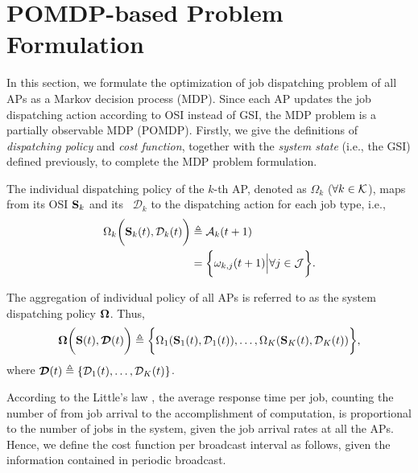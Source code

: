 \section{POMDP-based Problem Formulation}
\label{sec:formulation}
In this section, we formulate the optimization of job dispatching problem of all APs as a Markov decision process (MDP).
Since each AP updates the job dispatching action according to OSI instead of GSI, the MDP problem is a partially observable MDP (POMDP).
Firstly, we give the definitions of \emph{dispatching policy} and \emph{cost function}, together with the \emph{system state} (i.e., the GSI) defined previously, to complete the MDP problem formulation.

\begin{definition}
    The individual dispatching policy of the $k$-th AP, denoted as $\Omega_{k}$ ($\forall k \in\mathcal{K}$), maps from its OSI $\mathbf{S}_{k}$ and its \brlatency~$\mathcal{D}_{k}$ to the dispatching action for each job type, i.e.,
    \begin{align}
        \Omega_{k} \bigg( \mathbf{S}_{k}(t), \mathcal{D}_{k}(t) \bigg)
        &\triangleq \mathcal{A}_{k}(t+1)
        \nonumber\\
        &= \bigg\{
            \omega_{k,j}(t+1) \Big| \forall j\in\mathcal{J}
        \bigg\}.
        \label{def:action}
    \end{align}

    The aggregation of individual policy of all APs is referred to as the system dispatching policy $\boldsymbol{\Omega}$.
    Thus,
    {\small
    \begin{align}
        \boldsymbol{\Omega}\bigg( \mathbf{S}(t), \boldsymbol{\mathcal{D}}(t) \bigg) \triangleq \bigg\{
            \Omega_{1}(\mathbf{S}_{1}(t), \mathcal{D}_{1}(t)), \dots, \Omega_{K}(\mathbf{S}_{K}(t),\mathcal{D}_{K}(t))
        \bigg\},
    \end{align}
    }
    where $\boldsymbol{\mathcal{D}}(t) \triangleq \{ \mathcal{D}_{1}(t), \dots, \mathcal{D}_{K}(t) \}$.
\end{definition}

According to the Little's law \cite{Little1961}, the average response time per job, counting the number of  from job arrival to the accomplishment of computation, is proportional to the number of jobs in the system, given the job arrival rates at all the APs. %
Hence, we define the cost function per broadcast interval as follows, {given the information contained in periodic broadcast.}

